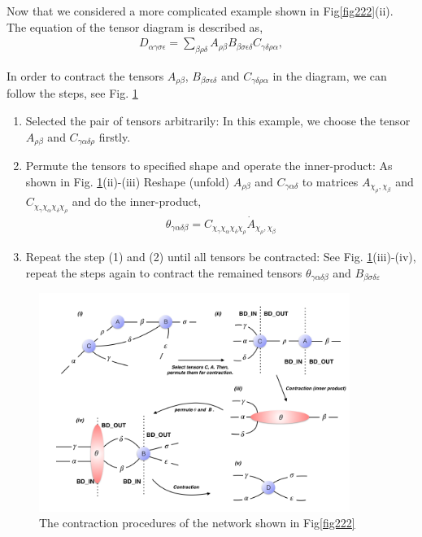 Now that we considered a more complicated example shown in Fig\ref{fig222}(ii). The equation of the tensor diagram is described as,
\begin{align}
	D_{\alpha \gamma \sigma \epsilon}=\sum_{\beta \rho \delta}{A_{\rho \beta}B_{\beta \sigma \epsilon \delta}C_{\gamma \delta \rho \alpha}},
\end{align}

In order to contract the tensors $A_{\rho \beta}$, $B_{\beta \sigma \epsilon \delta}$ and $C_{\gamma \delta \rho \alpha}$ in the diagram, we can follow the steps, see Fig. \ref{fig223}
\begin{enumerate}
	\item Selected the pair of tensors arbitrarily: In this example, we choose the tensor $A_{\rho \beta}$ and $C_{\gamma \alpha \delta \rho}$ firstly. 
	\item Permute the tensors to specified shape and operate the inner-product: As shown in Fig. \ref{fig223}(ii)-(iii) Reshape (unfold) $A_{\rho \beta}$ and $C_{\gamma \alpha \delta}$ to matrices $A_{\chi_{\rho}, \chi_{\beta}}$ and $C_{\chi_{\gamma} \chi_{\alpha} \chi_{\delta} \chi_{\rho}}$ and do the inner-product, 
		\begin{align}
			\theta_{\gamma \alpha \delta \beta} = C_{\chi_{\gamma} \chi_{\alpha} \chi_{\delta} \chi_{\rho}} \dot A_{\chi_{\rho}, \chi_{\beta}}
		\end{align}
	\item Repeat the step (1) and (2) until all tensors be contracted: See Fig. \ref{fig223}(iii)-(iv), repeat the steps again to contract the remained tensors $\theta_{\gamma \alpha \delta \beta}$ and $B_{\beta \sigma \delta \varepsilon}$
\end{enumerate}

\begin{figure}[ht]
	\centering
	\includegraphics[width=0.90\textwidth]{figures/fig223.png}
	\caption[The contraction procedures of the network shown in Fig\ref{fig222}(ii)]{ The contraction procedures of the network shown in Fig\ref{fig222}}
	\label{fig223}
\end{figure}

